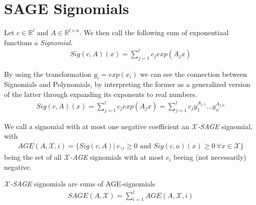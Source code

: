 \documentclass[./main.tex]{subfiles}
\begin{document}
\section{SAGE Signomials}
\begin{ddef}[Signomial]
Let $c \in \mathbb{R}^l$ and $A \in \mathbb{R}^{l \times n}$. We then call the following sum of exponentiaal functions a \emph{Signomial}.
\begin{align*}
Sig(c,A)(x) = \sum_{j=1}^l c_j exp(A_jx)
\end{align*}
\end{ddef}
By using the transformation $y_i=exp(x_i)$ we can see the connection between Signomials and Polynomials, by interpreting the former as a generalized version of the latter through expanding its exponents to real numbers.
\begin{align*}
Sig(c,A)(x) = \sum_{j=1}^l c_j exp(A_jx) = \sum_{j=1}^l c_j y_1^{A_{j,1}} \dots y_n^{A_{j,n}}
\end{align*}
\begin{ddef}
We call a signomial with at most one negative coefficient an \emph{$\mathcal{X}$-SAGE} signomial,  with
\begin{align*}
AGE(A,\mathcal{X}, i) = \lbrace Sig(c,A) | \ c_{\backslash i} \geq 0 \text{ and } Sig(c,a)(x) \geq 0 \ \forall x \in \mathcal{X} \rbrace
\end{align*}
being the set of all \emph{$\mathcal{X}$-AGE} signomials with at most $c_i$ beeing (not necessarily) negative.
\end{ddef}
\begin{ddef}
\emph{$\mathcal{X}$-SAGE} signomials are sums of AGE-signomials
\begin{align*}
SAGE(A,\mathcal{X}) = \sum_{i=1}^l AGE(A,\mathcal{X},i)
\end{align*}

\end{ddef}
\end{document}
